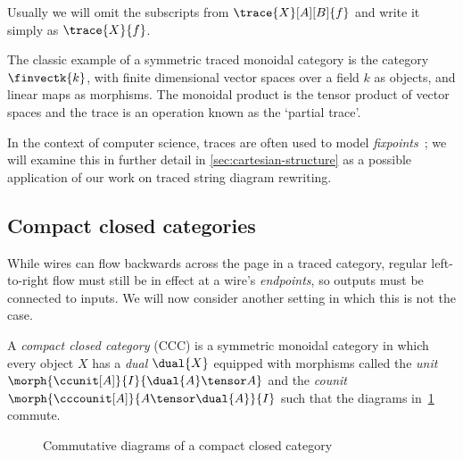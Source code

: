 Usually we will omit the subscripts from \(\trace{X}[A][B]{f}\) and write it
simply as \(\trace{X}{f}\).



\begin{example}
    The classic example of a symmetric traced monoidal category is the category
    \(\finvectk{k}\), with finite dimensional vector spaces over a field \(k\)
    as objects, and linear maps as morphisms.
    The monoidal product is the tensor product of vector spaces and the
    trace is an operation known as the `partial trace'.
\end{example}

In the context of computer science, traces are often used to model
\emph{fixpoints}~\cite{hasegawa1997recursion}; we will examine this in further
detail in \cref{sec:cartesian-structure} as a possible application of our work
on traced string diagram rewriting.

\subsection{Compact closed categories}

While wires can flow backwards across the page in a traced category, regular
left-to-right flow must still be in effect at a wire's \emph{endpoints}, so
outputs must be connected to inputs.
We will now consider another setting in which this is not the case.

\begin{definition}
    A \emph{compact closed category} (CCC) is a symmetric monoidal category in
    which every object \(X\) has a \emph{dual} \(\dual{X}\) equipped with
    morphisms called the \emph{unit} \(
    \morph{\ccunit[A]}{I}{\dual{A} \tensor A}
    \) and the \emph{counit} \(
    \morph{\cccounit[A]}{A \tensor \dual{A}}{I}
    \) such that the diagrams in~\cref{fig:snake-equations} commute.
\end{definition}

\begin{figure}
    \centering
    
    \quad
    
    \caption{Commutative diagrams of a compact closed category}
    \label{fig:snake-equations}
\end{figure}

